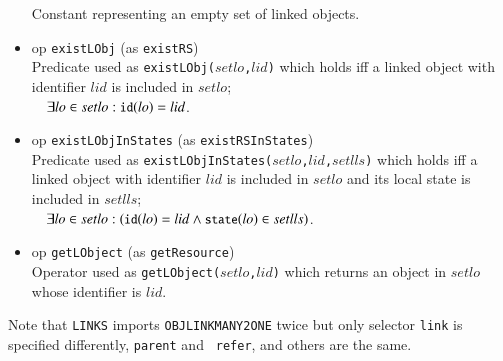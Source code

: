 \documentclass[12pt]{report}
\newcommand{\mbstt}[1]{\mbox{\small{\tt {#1}}}}
\newcommand{\stt}[1]{{\small{\tt {#1}}}}
\begin{document}
\begin{itemize}
  Constant representing an empty set of linked objects.
\item op \stt{existLObj} (as \stt{existRS})\\
  Predicate used as \stt{existLObj($setlo$,$lid$)} which holds iff a
  linked object with identifier $lid$ is included in
  $setlo$;\\$~~~~\exists lo\in setlo:\mbstt{id}(lo)=lid$.
\item op \stt{existLObjInStates} (as \stt{existRSInStates})\\
  Predicate used as \stt{existLObjInStates($setlo$,$lid$,$setlls$)}
  which holds iff a linked object with identifier $lid$ is included
  in $setlo$ and its local state is included in
  $setlls$;\\$~~~~\exists lo\in setlo:(\mbstt{id}(lo)=lid\land
  \mbstt{state}(lo)\in setlls)$.
\item op \stt{getLObject} (as \stt{getResource})\\
  Operator used as \stt{getLObject($setlo$,$lid$)} which returns an
  object in $setlo$ whose identifier is $lid$.
\end{itemize}
Note that {\tt LINKS} imports {\tt OBJLINKMANY2ONE} twice but only
selector {\tt link} is specified differently, {\tt parent} and {\tt
  refer}, and others are the same.
\end{document}
